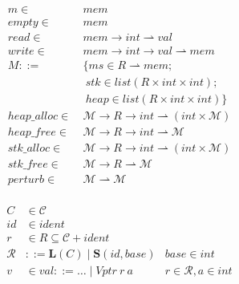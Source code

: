 \documentclass{article}
\begin{document}
\begin{figure}
  \begin{minipage}[t]{0.5\textwidth}
    \vspace{0em}
    \[\begin{split}
    m \in ~ & \mathit{mem} \\
    \mathit{empty} \in ~ & \mathit{mem} \\
    \mathit{read} \in ~ & \mathit{mem} \rightarrow \mathit{int} \rightharpoonup \mathit{val} \\
    \mathit{write} \in ~ & \mathit{mem} \rightarrow \mathit{int} \rightarrow \mathit{val}
    \rightharpoonup \mathit{mem} \\
    M ::= ~ & \{
    ms \in R \rightharpoonup \mathit{mem}; \\
    & ~ stk \in list (R \times \mathit{int} \times \mathit{int}); \\
    & ~ heap \in list (R \times \mathit{int} \times \mathit{int})
    \} \\
    \mathit{heap\_alloc} \in ~ & \mathcal{M} \rightarrow R \rightarrow \mathit{int} \rightharpoonup
    (\mathit{int} \times \mathcal{M}) \\
    \mathit{heap\_free} \in ~ & \mathcal{M} \rightarrow R \rightarrow \mathit{int} \rightharpoonup
    \mathcal{M} \\
    \mathit{stk\_alloc} \in ~ & \mathcal{M} \rightarrow R \rightarrow
    \mathit{int} \rightharpoonup (\mathit{int} \times \mathcal{M}) \\
    \mathit{stk\_free} \in ~ & \mathcal{M} \rightarrow R \rightharpoonup
    \mathcal{M} \\
    \mathit{perturb} \in ~ & \mathcal{M} \rightharpoonup \mathcal{M} \\
    \end{split}\]
  \end{minipage}
  \begin{minipage}[t]{0.49\textwidth}
    \vspace{0em}
    \[\begin{aligned}
    C & \in \mathcal{C} \\
    id & \in \mathit{ident} \\
    r & \in R \subseteq \mathcal{C} + \mathit{ident} \\
    \mathcal{R} & ::= \mathbf{L}(C) \mid \mathbf{S}(id, \mathit{base}) &
    \mathit{base} \in \mathit{int} \\
    v & \in \mathit{val} ::= \ldots \mid \mathit{Vptr} ~ r ~ a &
    r \in \mathcal{R}, a \in \mathit{int} \\

\end{aligned}\]
\end{minipage}
\end{figure}
\end{document}
